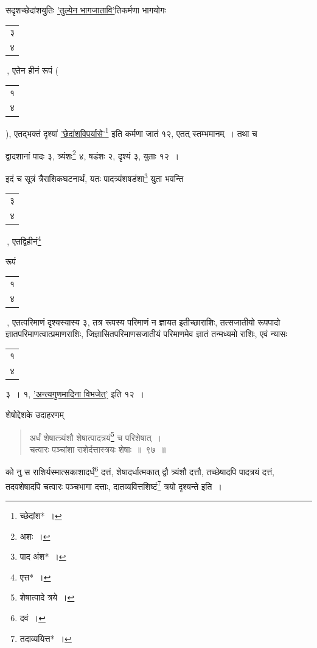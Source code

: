\documentclass[10pt, openany]{book}
\begin{document}
{{{{सदृशच्छेदांशयुतिः \hyperref[36]{'तुल्येन भागजातावि'}तिकर्मणा भागयोगः \begin{tabular}{|c|}३\\ ४\\\hline \end{tabular}\,, एतेन हीनं रूपं \bigg(\begin{tabular}{r}१\\ ४\end{tabular}\bigg), एतद्भक्तं दृश्यां \hyperref[33]{'छेदांशविपर्यासे'}\renewcommand{\thefootnote}{\s ७}\footnote{\s च्छेदांश*~।} इति कर्मणा जातं १२, एतत्
स्तम्भमानम्~। तथा च}
{द्वादशानां पादः ३, त्र्यंशः\renewcommand{\thefootnote}{\s ८}\footnote{\s अशः~।} ४, षडंशः २, दृश्यं ३, युताः १२~।}
\vspace{3mm}

{इदं च सूत्रं त्रैराशिकघटनार्थं, यतः पादत्र्यंशषडंशा\renewcommand{\thefootnote}{\s ९}\footnote{\s पाद अंश*~।} युता भवन्ति \begin{tabular}{|c|}३\\ ४\\\hline \end{tabular}\,, एतद्विहीनं\renewcommand{\thefootnote}{\s १०}\footnote{\s एत्त*~।}}
{रूपं \begin{tabular}{|c|} १\\ ४\\\hline \end{tabular}\,, एतत्परिमाणं दृश्यस्यास्य ३, तत्र रूपस्य परिमाणं न ज्ञायत
इतीच्छाराशिः, तत्सजातीयो रूपपादो ज्ञातपरिमाणत्वात्प्रमाणराशिः, जिज्ञासितपरिमाणसजातीयं
परिमाणमेव ज्ञातं तन्मध्यमो राशिः, एवं न्यासः \begin{tabular}{|c|} १\\ ४\\\hline \end{tabular} ३~। १, \hyperref[43]{'अन्त्यगुणमादिना विभजेत्'} इति १२~।}

\vspace{3mm}
{शेषोद्देशके उदाहरणम्\textemdash}
    
\begin{quote}

{\eg अर्धं शेषात्त्र्यंशौ शेषात्पादत्रयं\renewcommand{\thefootnote}{\s ११}\footnote{\s शेषात्पादे त्रये~।} च परिशेषात्~। \\
 चत्वारः पञ्चांशा राशेर्दत्तास्त्रयः शेषाः~॥~९७~॥}\end{quote}

\newpage

{को नु स राशिर्यस्मात्सकाशादर्धं\renewcommand{\thefootnote}{\s १}\footnote{\s *दवं~।} दत्तं, शेषादर्धात्मकात् द्वौ
त्र्यंशौ दत्तौ, तच्छेषादपि}
{पादत्रयं दत्तं, तदवशेषादपि चत्वारः पञ्चभागा दत्ताः,
दातव्यवित्तशिष्टं\renewcommand{\thefootnote}{\s २}\footnote{\s तदाव्ययित्त*~।} त्रयो दृश्यन्ते इति~।}
\vspace{3mm}

}}}
\end{document}
